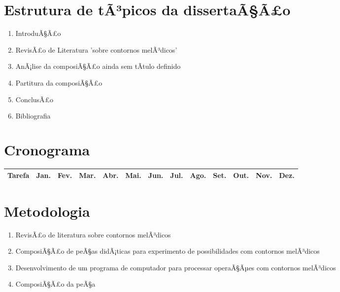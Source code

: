 \documentclass{article}
\begin{document}
\section{Estrutura de tÃ³picos da dissertaÃ§Ã£o}
\label{sec:estrutura-de-topicos}

\begin{enumerate}
\item IntroduÃ§Ã£o
\item RevisÃ£o de Literatura 'sobre contornos melÃ³dicos'
\item AnÃ¡lise da composiÃ§Ã£o ainda sem tÃ­tulo definido
\item Partitura da composiÃ§Ã£o
\item ConclusÃ£o
\item Bibliografia
\end{enumerate}

\section{Cronograma}
\label{sec:cronograma}

\begin{table}[h]
  \centering
  \begin{tabular}{lllllllllllll}
    \hline
    Tarefa & Jan. & Fev. & Mar. & Abr. & Mai. & Jun. & Jul. & Ago. & Set. &
    Out. & Nov. & Dez. \\
    \hline


    \hline
  \end{tabular}
  \label{tab:cronograma}
\end{table}


\section{Metodologia}
\label{sec:metodologia}

\begin{enumerate}
\item RevisÃ£o de literatura sobre contornos melÃ³dicos
\item ComposiÃ§Ã£o de peÃ§as didÃ¡ticas para experimento de possibilidades
  com contornos melÃ³dicos
\item Desenvolvimento de um programa de computador para processar
  operaÃ§Ãµes com contornos melÃ³dicos
\item ComposiÃ§Ã£o da peÃ§a
\end{enumerate}

\renewcommand{\refname}{Bibliografia}
\end{document}
